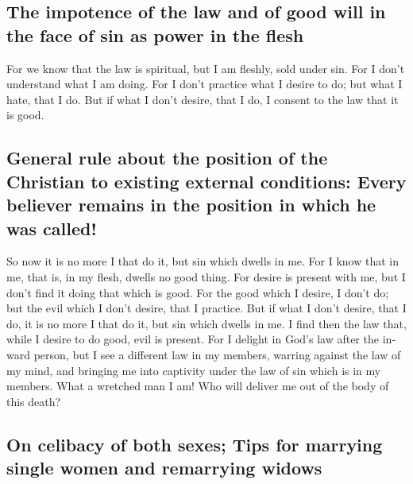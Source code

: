 \begin{paracol}{2}
\begin{otherlanguage}{english}
{\subsection{The impotence of the law and of good will in the face of sin
as power in the
flesh}\label{the-impotence-of-the-law-and-of-good-will-in-the-face-of-sin-as-power-in-the-flesh}}

 For we know that the law is spiritual, but I am fleshly,
sold under sin.  For I don't understand what I am doing.
For I don't practice what I desire to do; but what I hate, that I do.
 But if what I don't desire, that I do, I consent to the
law that it is good.

\hypertarget{general-rule-about-the-position-of-the-christian-to-existing-external-conditions-every-believer-remains-in-the-position-in-which-he-was-called}{%
\subsection{General rule about the position of the Christian to existing
external conditions: Every believer remains in the position in which he
was
called!}\label{general-rule-about-the-position-of-the-christian-to-existing-external-conditions-every-believer-remains-in-the-position-in-which-he-was-called}}

 So now it is no more I that do it, but sin which dwells
in me.  For I know that in me, that is, in my flesh,
dwells no good thing. For desire is present with me, but I don't find it
doing that which is good.  For the good which I desire, I
don't do; but the evil which I don't desire, that I practice.
 But if what I don't desire, that I do, it is no more I
that do it, but sin which dwells in me.  I find then the
law that, while I desire to do good, evil is present. 
For I delight in God's law after the inward person,  but
I see a different law in my members, warring against the law of my mind,
and bringing me into captivity under the law of sin which is in my
members.  What a wretched man I am! Who will deliver me
out of the body of this death?

\hypertarget{on-celibacy-of-both-sexes-tips-for-marrying-single-women-and-remarrying-widows}{%
\subsection{On celibacy of both sexes; Tips for marrying single women
and remarrying
widows}\label{on-celibacy-of-both-sexes-tips-for-marrying-single-women-and-remarrying-widows}}


\end{otherlanguage}
\end{paracol}
